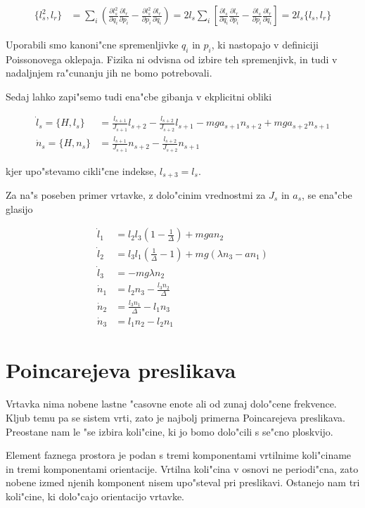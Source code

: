 \documentclass[a4paper,10pt]{article}
\newcommand{\parcialno}[2]{
  \frac{\partial #1}{\partial #2}
}
\begin{document}
\begin{align}
  \{l_s^2, l_r\} &= \sum_i\left( \parcialno{l_s^2}{q_i}\parcialno{l_r}{p_i} - \parcialno{l_s^2}{p_i}\parcialno{l_r}{q_i} \right) = 2l_s \sum_i\left[ \parcialno{l_s}{q_i}\parcialno{l_r}{p_i} - \parcialno{l_s}{p_i}\parcialno{l_r}{q_i} \right] = 2l_s \{l_s, l_r\}
\end{align}

Uporabili smo kanoni"cne spremenljivke $q_i$ in $p_i$, ki nastopajo v definiciji Poissonovega oklepaja. Fizika ni odvisna od izbire teh spremenjivk, in tudi v nadaljnjem ra"cunanju jih ne bomo potrebovali. 

Sedaj lahko zapi"semo tudi ena"cbe gibanja v ekplicitni obliki

\begin{align}
  \dot l_s = \{H,l_s\} &= \frac{l_{s+1}}{J_{s+1}}l_{s+2} - \frac{l_{s+2}}{J_{s+2}}l_{s+1} - mga_{s+1}n_{s+2} + mga_{s+2}n_{s+1} \\
  \dot n_s = \{H,n_s\} &= \frac{l_{s+1}}{J_{s+1}}n_{s+2} - \frac{l_{s+2}}{J_{s+2}}n_{s+1}
\end{align}

kjer upo"stevamo cikli"cne indekse, $l_{s+3} = l_s$. 

Za na"s poseben primer vrtavke, z dolo"cinim vrednostmi za $J_s$ in $a_s$, se ena"cbe glasijo

\begin{align}
  \dot l_1 &= l_2l_3 \left( 1 - \frac{1}{\Delta} \right) + mgan_2 \\
  \dot l_2 &= l_3l_1 \left( \frac{1}{\Delta} - 1 \right) + mg\left( \lambda n_3 - a n_1 \right) \\
  \dot l_3 &= -mg \lambda n_2 \\
  \dot n_1 &= l_2n_3 - \frac{l_3n_2}{\Delta} \\
  \dot n_2 &= \frac{l_3n_1}{\Delta} - l_1n_3 \\
  \dot n_3 &= l_1 n_2 - l_2 n_1
\end{align}

\section{Poincarejeva preslikava}

Vrtavka nima nobene lastne "casovne enote ali od zunaj dolo"cene frekvence. Kljub temu pa se sistem vrti, zato je najbolj primerna Poincarejeva preslikava. Preostane nam le "se izbira koli"cine, ki jo bomo dolo"cili s se"cno ploskvijo. 

Element faznega prostora je podan s tremi komponentami vrtilnime koli"ciname in tremi komponentami orientacije. Vrtilna koli"cina v osnovi ne periodi"cna, zato nobene izmed njenih komponent nisem upo"steval pri preslikavi. Ostanejo nam tri koli"cine, ki dolo"cajo orientacijo vrtavke. 
\end{document}

